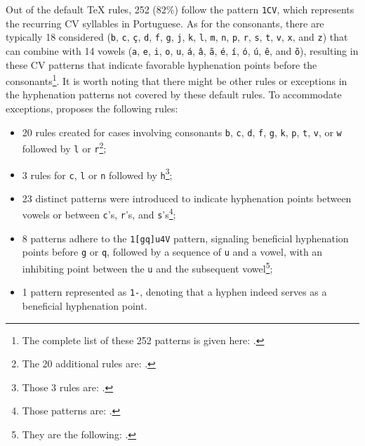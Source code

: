 %
%
Out of the default \TeX{} rules, 252 (82\%) follow the pattern \verb|1CV|, which
represents the recurring CV syllables in Portuguese.  As for the consonants,
there are typically 18 considered (\verb|b|, \verb|c|, \verb|ç|, \verb|d|,
\verb|f|, \verb|g|, \verb|j|, \verb|k|, \verb|l|, \verb|m|, \verb|n|, \verb|p|,
\verb|r|, \verb|s|, \verb|t|, \verb|v|, \verb|x|, and \verb|z|) that can
combine with 14 vowels (\verb|a|, \verb|e|, \verb|i|, \verb|o|, \verb|u|,
\verb|á|, \verb|â|, \verb|ã|, \verb|é|, \verb|í|, \verb|ó|, \verb|ú|, \verb|ê|,
and \verb|õ|), resulting in these CV patterns that indicate favorable
hyphenation points before the consonants\footnote{The complete list of these
252 patterns is given here: \ExceptionRulesCV{}.}. 
It is worth noting that there might
be other rules or exceptions in the hyphenation patterns not covered by these
default rules.  To accommodate exceptions, \textcite{rezende1987} proposes the 
following rules: 
\begin{itemize}
    \item 20 rules created for cases involving consonants \verb|b|, \verb|c|, \verb|d|, \verb|f|, \verb|g|, \verb|k|, \verb|p|, \verb|t|, \verb|v|, or \verb|w| followed by \verb|l| or \verb|r|\footnote{The 20 additional rules are: \ExceptionRulesLR{}.};
    \item 3 rules for \verb|c|, \verb|l| or \verb|n| followed by \verb|h|\footnote{Those 3 rules are: \ExceptionRulesCLNH{}.};
    \item 23 distinct patterns were introduced to indicate hyphenation points between vowels or between \verb|c|'s, \verb|r|'s, and \verb|s|'s\footnote{Those patterns are: \ExceptionRulesThree{}.}; 
    \item 8 patterns adhere to the \verb|1[gq]u4V| pattern, signaling beneficial hyphenation points before \verb|g| or \verb|q|, followed by a sequence of \verb|u| and a vowel, with an inhibiting point between the \verb|u| and the subsequent vowel\footnote{They are the following: \ExceptionRulesFour{}.};
    \item 1 pattern represented as \verb|1-|, denoting that a hyphen indeed serves as a beneficial hyphenation point.
\end{itemize}



